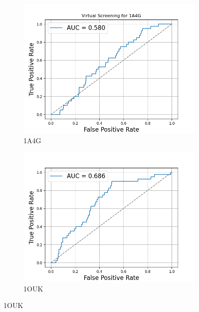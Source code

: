 \documentclass[a4paper,10pt]{article}
\begin{document}
\begin{figure}[h!]
  \centering

  \begin{subfigure}{0.45\linewidth}
    \includegraphics[width=\linewidth]{figures/ROC.png}
    \caption{1A4G}
    \label{fig:a}
  \end{subfigure}
  \hfill
  \begin{subfigure}{0.45\linewidth}
    \includegraphics[width=\linewidth]{figures/ROC-1OUK.png}
    \caption{1OUK}
    \label{fig:b}
  \end{subfigure}

  \vspace{1em}


\end{figure}
\end{document}
